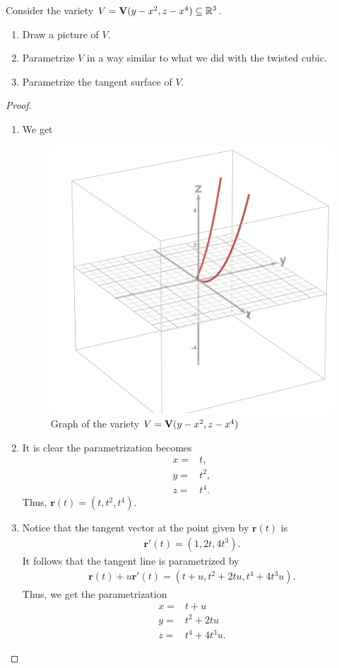 \begin{exercise}{12}
Consider the variety $V = \mathbf{V}(y-x^2,z-x^4)\subseteq\mathbb{R}^3$.
\begin{enumerate}
    \item Draw a picture of $V$.
    \item Parametrize $V$ in a way similar to what we did with the twisted cubic.
    \item Parametrize the tangent surface of $V$.
\end{enumerate}
\end{exercise}
\begin{proof}
    \begin{enumerate}
        \item We get
        \begin{figure}[H]
            \centering
            \includegraphics[width=0.5\linewidth]{cox-little-oshea/ch1/assets/sec1-3-ex12.png}
            \caption{Graph of the variety $V = \mathbf{V}(y-x^2,z-x^4)$}
            \label{fig:sec1-3-ex12}
        \end{figure}
        \item It is clear the parametrization becomes
        \begin{align*}
            x =& t,\\
            y =& t^2,\\
            z =& t^4.
        \end{align*}
        Thus, $\mathbf{r}(t)= (t, t^2, t^4)$.
        \item Notice that the tangent vector at the point given by $\mathbf{r}(t)$ is 
        \begin{align*}
            \mathbf{r}'(t) = (1, 2t, 4t^3).
        \end{align*}
        It follows that the tangent line is parametrized by
        \begin{align*}
            \mathbf{r}(t) + u\mathbf{r}'(t) = (t + u, t^2 + 2tu, t^4 + 4t^3 u).
        \end{align*}
        Thus, we get the parametrization
        \begin{align*}
            x =& t+u\\
            y =& t^2 + 2tu\\
            z =& t^4 + 4t^3 u.
        \end{align*}
    \end{enumerate}
\end{proof}

